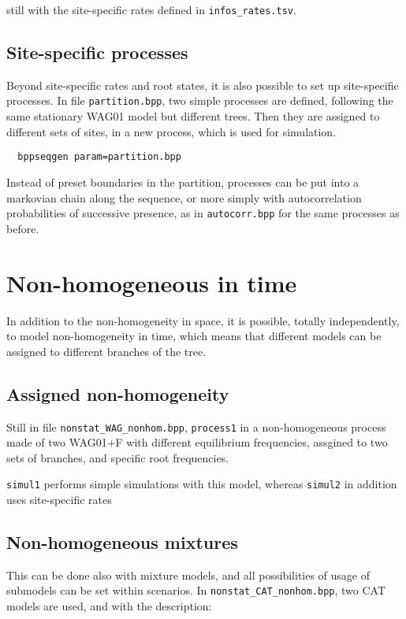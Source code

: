 \documentclass{article}
\begin{document}
still with the site-specific rates defined in \verb|infos_rates.tsv|.

\subsection{Site-specific processes}

Beyond site-specific rates and root states, it is also possible to set
up site-specific processes. In file \verb|partition.bpp|, two simple
processes are defined, following the same stationary WAG01 model but
different trees. Then they are assigned to different sets of sites, in
a new process, which is used for simulation.

\begin{verbatim}
  bppseqgen param=partition.bpp
\end{verbatim}

Instead of preset boundaries in the partition, processes can be put
into a markovian chain along the sequence, or more simply with
autocorrelation probabilities of successive presence, as in
\verb|autocorr.bpp| for the same processes as before.


\section{Non-homogeneous in time}

In addition to the non-homogeneity in space, it is possible, totally
independently, to model non-homogeneity in time, which means that
different models can be assigned to different branches of the tree.


\subsection{Assigned non-homogeneity}
  
Still in file \verb|nonstat_WAG_nonhom.bpp|, \texttt{process1} in a
non-homogeneous process made of two WAG01+F with
different equilibrium frequencies, assgined to two sets of branches,
and specific root frequencies.

\texttt{simul1} performs simple simulations with this model, whereas
\texttt{simul2} in addition uses site-specific rates

\subsection{Non-homogeneous mixtures}

This can be done also with mixture models, and all possibilities of
usage of submodels can be set within scenarios. In
\verb|nonstat_CAT_nonhom.bpp|, two CAT models are used, and with the
description:
\end{document}

